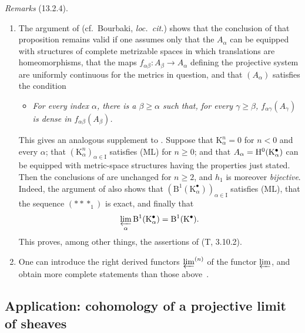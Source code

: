 \begin{env}[13.2.4]
\label{0.13.2.4}
\emph{Remarks} (13.2.4).
\begin{enumerate}
  \item[{\rm(i)}]
  The argument of 
  (cf.\ Bourbaki, \emph{loc.\ cit.}) shows that the conclusion of
  that proposition remains valid if one assumes only that the
  $A_\alpha$ can be equipped with structures of complete metrizable
  spaces in which translations are homeomorphisms, that the maps
  $f_{\alpha\beta}:A_\beta\longrightarrow A_\alpha$ defining the
  projective system are uniformly continuous for the metrics in
  question, and that $(A_\alpha)$ satisfies the condition
  \begin{itemize}
    \item[\textbf{(ML')}]
    \emph{For every index $\alpha$, there is a $\beta\geq\alpha$ such
    that, for every $\gamma\geq\beta$,
    $f_{\alpha\gamma}(A_\gamma)$ is dense in
    $f_{\alpha\beta}(A_\beta)$.}
  \end{itemize}

  This gives an analogous supplement to .
  Suppose that $\mathrm{K}^n_\alpha=0$ for $n<0$ and every $\alpha$;
  that
  $(\mathrm{K}^n_\alpha)_{\alpha\in\mathrm{I}}$ satisfies (ML) for
  $n\geq0$; and that
  $A_\alpha=\mathrm{H}^0(\mathrm{K}^\bullet_\alpha)$ can be equipped with
  metric-space structures having the properties just stated.
  Then the conclusions of  are unchanged for
  $n\geq2$, and $h_1$ is moreover \emph{bijective}.
  Indeed, the argument of  also shows that
  $(\mathrm{B}^1(\mathrm{K}^\bullet_\alpha))_{\alpha\in\mathrm{I}}$
  satisfies (ML), that the sequence $(***_1)$ is exact, and finally
  that
  \[
    \varprojlim_\alpha
    \mathrm{B}^1(\mathrm{K}^\bullet_\alpha)
    =
    \mathrm{B}^1(\mathrm{K}^\bullet).
  \]
  This proves, among other things, the assertions of (T, 3.10.2).

  \item[{\rm(ii)}]
  One can introduce the right derived functors
  $\varprojlim^{(n)}$ of the functor $\varprojlim$, and obtain more
  complete statements than those above~\cite{III-28}.
\end{enumerate}
\end{env}

\subsection{Application: cohomology of a projective limit of sheaves}
\label{subsection:0.13.3}

